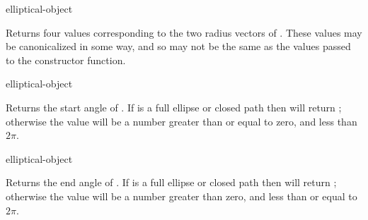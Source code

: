  {elliptical-object}

Returns four values corresponding to the two radius vectors of
.  These values may be canonicalized in some way, and so may
not be the same as the values passed to the constructor function.

 {elliptical-object}

Returns the start angle of .  If 
is a full ellipse or closed path then  will return
; otherwise the value will be a number greater than or equal to zero,
and less than $2\pi$.

 {elliptical-object}

Returns the end angle of .  If  is
a full ellipse or closed path then  will return ;
otherwise the value will be a number greater than zero, and less than or equal
to $2\pi$.

